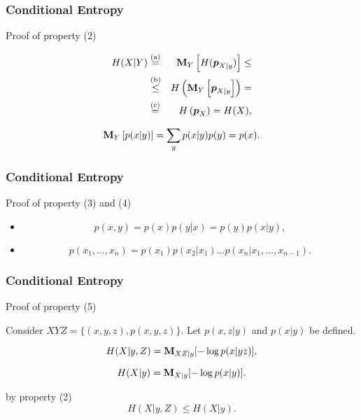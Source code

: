 \documentclass[14pt]{beamer}
\renewcommand{\vec}[1]{\ensuremath{\boldsymbol{#1}}}
\begin{document}
\begin{frame}
\frametitle{Conditional Entropy}
Proof of property (2)
\begin{itemize}
\footnotesize {
    
    \item
    \begin{eqnarray*}
    H(X\vert Y) &\stackrel{\rm (a)}{=}& {\rm {\bf M}}_Y \left[ {H(\vec
    p_{X\vert y} )} \right] \le \\
    &\stackrel{\rm (b)}{\le} & H\left( {\rm {\bf M}}_Y \left[ \vec
    p_{X\vert y} \right] \right) =\\
    &\stackrel{\rm (c)}{=} & H\left(\vec p_X \right) = H(X),
    \end{eqnarray*}
    
    \item
    \[
    {\rm {\bf M}}_Y \left[ {p(x\vert y)} \right] = \sum\limits_y
    {p(x\vert y)} p(y) = p(x).
    \]
}
\end{itemize}
\end{frame}



\begin{frame}
\frametitle{Conditional Entropy}
Proof of property (3) and (4)
\begin{itemize}

    \item
    \[
    p(x,y) = p(x)p(y\vert x) = p(y)p(x\vert y),
    \]
    
    \item
    \[
    p(x_1 ,...,x_n ) = p(x_1 )p(x_2 \vert x_1 )...p(x_n \vert x_1 ,...,x_{n - 1}
    ).
    \]
    
\end{itemize}
\end{frame}


\begin{frame}
\frametitle{Conditional Entropy}
Proof of property (5)
\begin{itemize}
\small{
    \item Consider $XYZ = \{(x,y,z),p(x,y,z)\}$. Let $p(x,z\vert y)$ and $p(x\vert y)$ be defined. 
    
    \item
    \[
    H(X\vert y,Z) = {\rm {\bf M}}_{XZ\vert y} [ - \log p(x\vert yz)],
    \]

    \item
    \[
    H(X\vert y) = {\rm {\bf M}}_{X\vert y} [ - \log p(x\vert y)].
    \]
    
    \item by property (2)
    \[
    H(X\vert y,Z) \le H(X\vert y).
    \]
}
\end{itemize}
\end{frame}
\end{document}
